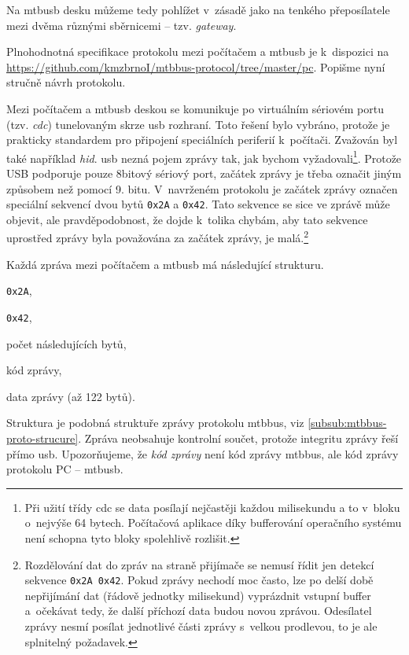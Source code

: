 Na \gls{mtbusb} desku můžeme tedy pohlížet v~zásadě jako na tenkého
přeposílatele mezi dvěma různými sběrnicemi – tzv. \textit{gateway}.

Plnohodnotná specifikace protokolu mezi počítačem a \gls{mtbusb} je
k~dispozici na \url{https://github.com/kmzbrnoI/mtbbus-protocol/tree/master/pc}.
Popišme nyní stručně návrh protokolu.

Mezi počítačem a \gls{mtbusb} deskou se komunikuje po virtuálním sériovém portu
(tzv. \textit{\gls{cdc}}) tunelovaným skrze \gls{usb} rozhraní. Toto řešení
bylo vybráno, protože je prakticky standardem pro připojení speciálních
periferií k~počítači.  Zvažován byl také například \textit{\gls{hid}}.
\gls{usb} nezná pojem zprávy tak, jak bychom
vyžadovali\footnote{Při užití třídy \gls{cdc} se data posílají nejčastěji
každou milisekundu a to v~bloku o~nejvýše 64 bytech.  Počítačová aplikace díky
bufferování operačního systému není schopna tyto bloky spolehlivě rozlišit.}.
Protože USB podporuje pouze 8bitový sériový port, začátek zprávy je třeba
označit jiným způsobem než pomocí 9. bitu. V~navrženém protokolu je začátek
zprávy označen speciální sekvencí dvou bytů \texttt{0x2A} a \texttt{0x42}. Tato sekvence
se sice ve zprávě může objevit, ale pravděpodobnost, že dojde k~tolika chybám,
aby tato sekvence uprostřed zprávy byla považována za začátek zprávy, je
malá.\footnote{Rozdělování dat do zpráv na straně přijímače se
nemusí řídit jen detekcí sekvence \texttt{0x2A 0x42}. Pokud zprávy nechodí moc
často, lze po delší době nepřijímání dat (řádově jednotky milisekund) vyprázdnit
vstupní buffer a~očekávat tedy, že další příchozí data budou novou zprávou.
Odesílatel zprávy nesmí posílat jednotlivé části zprávy s~velkou prodlevou, to
je ale splnitelný požadavek.}

Každá zpráva mezi počítačem a \gls{mtbusb} má následující strukturu.

\begin{compactenum}
\item \texttt{0x2A},
\item \texttt{0x42},
\item počet následujících bytů,
\item kód zprávy,
\item data zprávy (až 122 bytů).
\end{compactenum}

Struktura je podobná struktuře zprávy protokolu \gls{mtbbus}, viz
\ref{subsub:mtbbus-proto-strucure}. Zpráva neobsahuje kontrolní součet, protože
integritu zprávy řeší přímo \gls{usb}.
Upozorňujeme, že \textit{kód zprávy} není kód zprávy \gls{mtbbus},
ale kód zprávy protokolu PC – \gls{mtbusb}.

